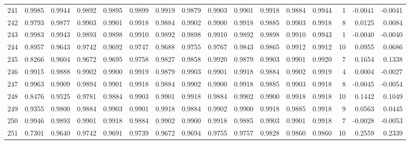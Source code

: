 \begin{tabular}{lrrrrrrrrrrrrrrr}
241 &      0.9985 &  0.9944 &  0.9892 &  0.9895 &  0.9899 &  0.9919 &  0.9879 &  0.9903 &  0.9901 &  0.9918 &   0.9884 &     0.9944 &      1 &                   -0.0041 &                    -0.0041 \\
242 &      0.9793 &  0.9877 &  0.9903 &  0.9901 &  0.9918 &  0.9884 &  0.9902 &  0.9900 &  0.9918 &  0.9885 &   0.9903 &     0.9918 &      8 &                    0.0125 &                     0.0084 \\
243 &      0.9983 &  0.9943 &  0.9893 &  0.9898 &  0.9910 &  0.9892 &  0.9898 &  0.9910 &  0.9892 &  0.9898 &   0.9910 &     0.9943 &      1 &                   -0.0040 &                    -0.0040 \\
244 &      0.8957 &  0.9643 &  0.9742 &  0.9692 &  0.9747 &  0.9688 &  0.9755 &  0.9767 &  0.9843 &  0.9865 &   0.9912 &     0.9912 &     10 &                    0.0955 &                     0.0686 \\
245 &      0.8266 &  0.9604 &  0.9672 &  0.9695 &  0.9758 &  0.9827 &  0.9858 &  0.9920 &  0.9879 &  0.9903 &   0.9901 &     0.9920 &      7 &                    0.1654 &                     0.1338 \\
246 &      0.9915 &  0.9888 &  0.9902 &  0.9900 &  0.9919 &  0.9879 &  0.9903 &  0.9901 &  0.9918 &  0.9884 &   0.9902 &     0.9919 &      4 &                    0.0004 &                    -0.0027 \\
247 &      0.9963 &  0.9909 &  0.9894 &  0.9901 &  0.9918 &  0.9884 &  0.9902 &  0.9900 &  0.9918 &  0.9885 &   0.9903 &     0.9918 &      8 &                   -0.0045 &                    -0.0054 \\
248 &      0.8476 &  0.9525 &  0.9781 &  0.9884 &  0.9903 &  0.9901 &  0.9918 &  0.9884 &  0.9902 &  0.9900 &   0.9918 &     0.9918 &     10 &                    0.1442 &                     0.1049 \\
249 &      0.9355 &  0.9800 &  0.9884 &  0.9903 &  0.9901 &  0.9918 &  0.9884 &  0.9902 &  0.9900 &  0.9918 &   0.9885 &     0.9918 &      9 &                    0.0563 &                     0.0445 \\
250 &      0.9946 &  0.9893 &  0.9901 &  0.9918 &  0.9884 &  0.9902 &  0.9900 &  0.9918 &  0.9885 &  0.9903 &   0.9901 &     0.9918 &      7 &                   -0.0028 &                    -0.0053 \\
251 &      0.7301 &  0.9640 &  0.9742 &  0.9691 &  0.9739 &  0.9672 &  0.9694 &  0.9755 &  0.9757 &  0.9828 &   0.9860 &     0.9860 &     10 &                    0.2559 &                     0.2339 \\

\end{tabular}
